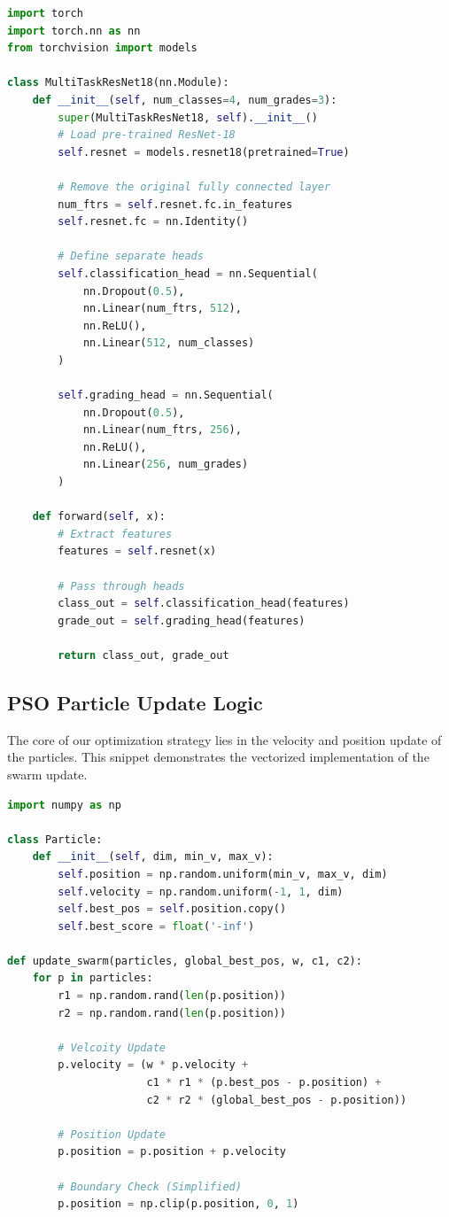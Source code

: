 \documentclass[11pt, a4paper]{article}
\begin{document}
\begin{lstlisting}[language=Python, caption=Modified ResNet-18 Architecture]
import torch
import torch.nn as nn
from torchvision import models

class MultiTaskResNet18(nn.Module):
    def __init__(self, num_classes=4, num_grades=3):
        super(MultiTaskResNet18, self).__init__()
        # Load pre-trained ResNet-18
        self.resnet = models.resnet18(pretrained=True)
        
        # Remove the original fully connected layer
        num_ftrs = self.resnet.fc.in_features
        self.resnet.fc = nn.Identity()
        
        # Define separate heads
        self.classification_head = nn.Sequential(
            nn.Dropout(0.5),
            nn.Linear(num_ftrs, 512),
            nn.ReLU(),
            nn.Linear(512, num_classes)
        )
        
        self.grading_head = nn.Sequential(
            nn.Dropout(0.5),
            nn.Linear(num_ftrs, 256),
            nn.ReLU(),
            nn.Linear(256, num_grades)
        )

    def forward(self, x):
        # Extract features
        features = self.resnet(x)
        
        # Pass through heads
        class_out = self.classification_head(features)
        grade_out = self.grading_head(features)
        
        return class_out, grade_out
\end{lstlisting}

\subsection{PSO Particle Update Logic}
The core of our optimization strategy lies in the velocity and position update of the particles. This snippet demonstrates the vectorized implementation of the swarm update.

\begin{lstlisting}[language=Python, caption=PSO Update Mechanism]
import numpy as np

class Particle:
    def __init__(self, dim, min_v, max_v):
        self.position = np.random.uniform(min_v, max_v, dim)
        self.velocity = np.random.uniform(-1, 1, dim)
        self.best_pos = self.position.copy()
        self.best_score = float('-inf')

def update_swarm(particles, global_best_pos, w, c1, c2):
    for p in particles:
        r1 = np.random.rand(len(p.position))
        r2 = np.random.rand(len(p.position))
        
        # Velcoity Update
        p.velocity = (w * p.velocity + 
                      c1 * r1 * (p.best_pos - p.position) + 
                      c2 * r2 * (global_best_pos - p.position))
        
        # Position Update
        p.position = p.position + p.velocity
        
        # Boundary Check (Simplified)
        p.position = np.clip(p.position, 0, 1)
\end{lstlisting}
\end{document}
